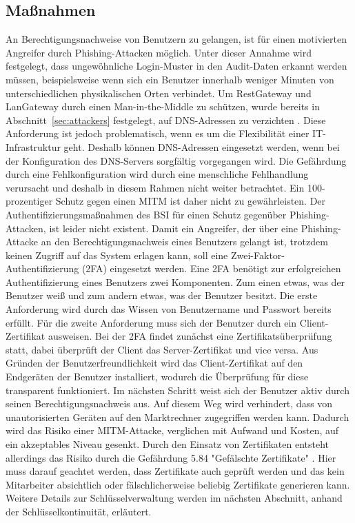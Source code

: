 \documentclass[11pt,a4paper]{report}
\begin{document}
\subsection{Maßnahmen}

An Berechtigungsnachweise von Benutzern zu gelangen, ist für einen motivierten Angreifer durch Phishing-Attacken möglich. Unter dieser Annahme wird festgelegt, dass ungewöhnliche Login-Muster in den Audit-Daten erkannt werden müssen, beispielsweise wenn sich ein Benutzer innerhalb weniger Minuten von unterschiedlichen physikalischen Orten verbindet. Um RestGateway und LanGateway durch einen Man-in-the-Middle zu schützen, wurde bereits in Abschnitt~\ref{sec:attackers} festgelegt, auf DNS-Adressen zu verzichten \cite{bsi_m5059}. Diese Anforderung ist jedoch problematisch, wenn es um die Flexibilität einer IT-Infrastruktur geht. Deshalb können DNS-Adressen eingesetzt werden, wenn bei der Konfiguration des DNS-Servers sorgfältig vorgegangen wird. Die Gefährdung durch eine Fehlkonfiguration wird durch eine menschliche Fehlhandlung verursacht und deshalb in diesem Rahmen nicht weiter betrachtet. Ein 100-prozentiger Schutz gegen einen MITM ist daher nicht zu gewährleisten. Der Authentifizierungsmaßnahmen des BSI für einen Schutz gegenüber Phishing-Attacken, ist leider nicht existent. Damit ein Angreifer, der über eine Phishing-Attacke an den Berechtigungsnachweis eines Benutzers gelangt ist, trotzdem keinen Zugriff auf das System erlagen kann, soll eine Zwei-Faktor-Authentifizierung (2FA) eingesetzt werden. Eine 2FA benötigt zur erfolgreichen Authentifizierung eines Benutzers zwei Komponenten. Zum einen etwas, was der Benutzer weiß und zum andern etwas, was der Benutzer besitzt. Die erste Anforderung wird durch das Wissen von Benutzername und Passwort bereits erfüllt. Für die zweite Anforderung muss sich der Benutzer durch ein Client-Zertifikat ausweisen. Bei der 2FA findet zunächst eine Zertifikatsüberprüfung statt, dabei überprüft der Client das Server-Zertifikat und vice versa. Aus Gründen der Benutzerfreundlichkeit wird das Client-Zertifikat auf den Endgeräten der Benutzer installiert, wodurch die Überprüfung für diese transparent funktioniert. Im nächsten Schritt weist sich der Benutzer aktiv durch seinen Berechtigungsnachweis aus. Auf diesem Weg wird verhindert, dass von unautorisierten Geräten auf den Marktrechner zugegriffen werden kann. Dadurch wird das Risiko einer MITM-Attacke, verglichen mit Aufwand und Kosten, auf ein akzeptables Niveau gesenkt. Durch den Einsatz von Zertifikaten entsteht allerdings das Risiko durch die Gefährdung 5.84 "Gefälschte Zertifikate" \cite{bsi_g5084}. Hier muss darauf geachtet werden, dass Zertifikate auch geprüft werden und das kein Mitarbeiter absichtlich oder fälschlicherweise beliebig Zertifikate generieren kann. Weitere Details zur Schlüsselverwaltung werden im nächsten Abschnitt, anhand der Schlüsselkontinuität, erläutert.
\end{document}
